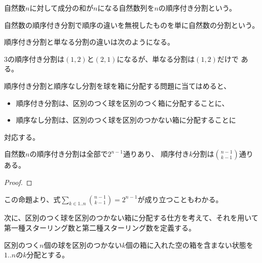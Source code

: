 	\begin{definition}\label{def:自然数の順序つき分割} %
		自然数$n$に対して成分の和が$n$になる自然数列を$n$の順序付き分割という。
	\end{definition} %

	\begin{definition}\label{def:自然数の分割} %
		自然数の順序付き分割で順序の違いを無視したものを単に自然数の分割という。
	\end{definition} %

	順序付き分割と単なる分割の違いは次のようになる。

	\begin{example}[自然数の順序付き分割と単なる分割の違い]\label{eg:自然数の順序付き分割と単なる分割の違い} %
		$3$の順序付き分割は$(1,2)$と$(2,1)$になるが、単なる分割は$(1,2)$だけで
		ある。
	\end{example} %

	順序付き分割と順序なし分割を球を箱に分配する問題に当てはめると、
	\begin{itemize}\setlength{\itemsep}{-1mm} %
		\item 順序付き分割は、区別のつく球を区別のつく箱に分配することに、
		\item 順序なし分割は、区別のつく球を区別のつかない箱に分配することに
	\end{itemize} %
	対応する。

	\begin{proposition}[順序付き分割の個数]\label{prop:順序付き分割の個数} %
		自然数$n$の順序付き分割は全部で$2^{n-1}$通りあり、
		順序付き$k$分割は$\binom{n-1}{k-1}$通りある。
	\end{proposition} %
	\begin{proof} %
	\end{proof} %

	この命題より、式$\sum_{k\in1..n}\binom{n-1}{k-1}=2^{n-1}$が成り立つこともわかる。

	次に、区別のつく球を区別のつかない箱に分配する仕方を考えて、それを用いて
	第一種スターリング数と第二種スターリング数を定義する。

	\begin{definition}[分配]\label{def:分配} %
		区別のつく$n$個の球を区別のつかない$k$個の箱に入れた空の箱を含まない状態を
		$1..n$の$k$分配とする。
	\end{definition} %

